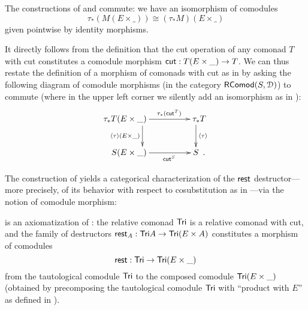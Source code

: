 \documentclass[a4paper,USenglish]{lipics}
\begin{document}
\begin{rem}\label{rem:prod_pullback_commute}
 The constructions of  and  commute:
 we have an isomorphism of comodules 
  \[     \tau_*(M(E\times \_)) \cong (\tau_*M)(E \times \_)        \]
 given pointwise by identity morphisms.
\end{rem}


\begin{Long}

It directly follows from the definition that the cut operation of any comonad $T$ with cut 
constitutes a comodule morphism $\mathsf{cut} : T(E\times \_) \to T$.
We can thus restate the definition of a morphism of comonads with cut as in  by asking the following diagram 
of comodule morphisms (in the category $\mathsf{RComod}(S,\mathcal{D})$) to commute
(where in the upper left corner we silently add an isomorphism as in ):
 \[ \begin{xy}
       \xymatrix{  **[l] \tau_*T(E\times \_ )  \ar[r]^{\tau_*(\cut^T)} \ar[d]_{\induced{\tau}(E\times \_)}  &  **[r] \tau_*T \ar[d]^{\induced{\tau}} \\
                   **[l]  S (E\times \_ ) \ar[r]_{\cut^S}  &  **[r] S  \enspace .
        }
      \end{xy}
   \]

\end{Long}



\begin{Long}
The construction of  yields a categorical characterization of the $\mathsf{rest}$ destructor---%
more precisely, of its behavior with respect to cosubstitution as in ---via the notion of comodule morphism:


\begin{ex}\label{ex:tail_comodule_alternative}
 is an axiomatization of :
the relative comonad $\mathsf{Tri}$ is a relative comonad with cut, and 
the family of destructors $\mathsf{rest}_A : \mathsf{Tri} A \to \mathsf{Tri} (E\times A)$ constitutes a morphism of comodules
\[ \mathsf{rest} : \mathsf{Tri} \to \mathsf{Tri} (E \times \_ ) \]
from the tautological comodule $\mathsf{Tri}$ to the composed comodule $\mathsf{Tri} (E\times \_)$ (obtained by precomposing the tautological comodule $\mathsf{Tri}$
with \enquote{product with $E$} as defined in ).
  
\end{ex}
\end{Long}
\end{document}
